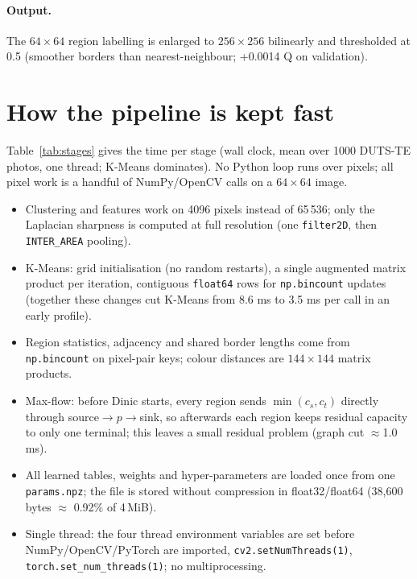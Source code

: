 \documentclass[11pt,a4paper]{article}
\begin{document}
\paragraph{Output.} The $64{\times}64$ region labelling is enlarged to $256{\times}256$ bilinearly and thresholded at 0.5 (smoother borders than nearest-neighbour; +0.0014 Q on validation).

\section{How the pipeline is kept fast}
Table~\ref{tab:stages} gives the time per stage (wall clock, mean over 1000 DUTS-TE photos, one thread; K-Means dominates). No Python loop runs over pixels; all pixel work is a handful of NumPy/OpenCV calls on a $64{\times}64$ image.
\begin{itemize}\itemsep0pt
\item Clustering and features work on 4096 pixels instead of 65\,536; only the Laplacian sharpness is computed at full resolution (one \texttt{filter2D}, then \texttt{INTER\_AREA} pooling).
\item K-Means: grid initialisation (no random restarts), a single augmented matrix product per iteration, contiguous \texttt{float64} rows for \texttt{np.bincount} updates (together these changes cut K-Means from 8.6 ms to 3.5 ms per call in an early profile).
\item Region statistics, adjacency and shared border lengths come from \texttt{np.bincount} on pixel-pair keys; colour distances are $144{\times}144$ matrix products.
\item Max-flow: before Dinic starts, every region sends $\min(c_s,c_t)$ directly through source$\to p\to$sink, so afterwards each region keeps residual capacity to only one terminal; this leaves a small residual problem (graph cut $\approx$1.0 ms).
\item All learned tables, weights and hyper-parameters are loaded once from one \texttt{params.npz}; the file is stored without compression in float32/float64 (38,600 bytes $\approx$ 0.92\% of 4\,MiB).
\item Single thread: the four thread environment variables are set before NumPy/OpenCV/PyTorch are imported, \texttt{cv2.setNumThreads(1)}, \texttt{torch.set\_num\_threads(1)}; no multiprocessing.
\end{itemize}
\end{document}
